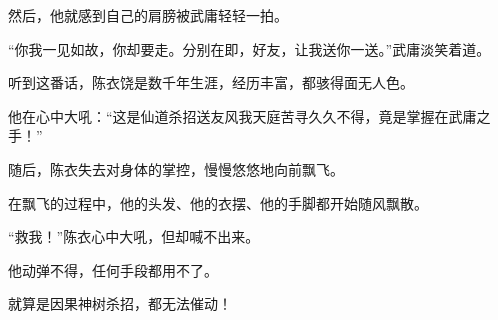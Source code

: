 \begin{this_body}
然后，他就感到自己的肩膀被武庸轻轻一拍。

“你我一见如故，你却要走。分别在即，好友，让我送你一送。”武庸淡笑着道。

听到这番话，陈衣饶是数千年生涯，经历丰富，都骇得面无人色。

他在心中大吼：“这是仙道杀招送友风我天庭苦寻久久不得，竟是掌握在武庸之手！”

随后，陈衣失去对身体的掌控，慢慢悠悠地向前飘飞。

在飘飞的过程中，他的头发、他的衣摆、他的手脚都开始随风飘散。

“救我！”陈衣心中大吼，但却喊不出来。

他动弹不得，任何手段都用不了。

就算是因果神树杀招，都无法催动！

\end{this_body}

